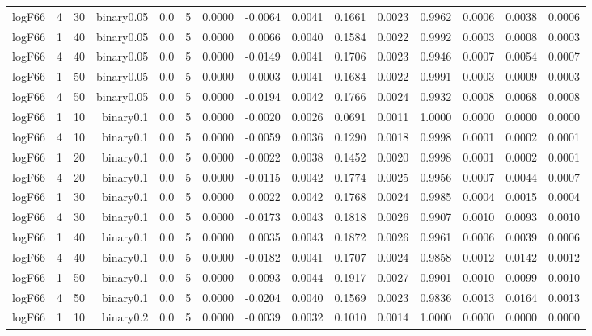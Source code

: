 \begin{longtable}{rrrrrrrrrrrrrrr}
  logF66 & 4 & 30 & binary0.05 & 0.0 & 5 & 0.0000 & -0.0064 & 0.0041 & 0.1661 & 0.0023 & 0.9962 & 0.0006 & 0.0038 & 0.0006 \\ 
  logF66 & 1 & 40 & binary0.05 & 0.0 & 5 & 0.0000 & 0.0066 & 0.0040 & 0.1584 & 0.0022 & 0.9992 & 0.0003 & 0.0008 & 0.0003 \\ 
  logF66 & 4 & 40 & binary0.05 & 0.0 & 5 & 0.0000 & -0.0149 & 0.0041 & 0.1706 & 0.0023 & 0.9946 & 0.0007 & 0.0054 & 0.0007 \\ 
  logF66 & 1 & 50 & binary0.05 & 0.0 & 5 & 0.0000 & 0.0003 & 0.0041 & 0.1684 & 0.0022 & 0.9991 & 0.0003 & 0.0009 & 0.0003 \\ 
  logF66 & 4 & 50 & binary0.05 & 0.0 & 5 & 0.0000 & -0.0194 & 0.0042 & 0.1766 & 0.0024 & 0.9932 & 0.0008 & 0.0068 & 0.0008 \\ 
  logF66 & 1 & 10 & binary0.1 & 0.0 & 5 & 0.0000 & -0.0020 & 0.0026 & 0.0691 & 0.0011 & 1.0000 & 0.0000 & 0.0000 & 0.0000 \\ 
  logF66 & 4 & 10 & binary0.1 & 0.0 & 5 & 0.0000 & -0.0059 & 0.0036 & 0.1290 & 0.0018 & 0.9998 & 0.0001 & 0.0002 & 0.0001 \\ 
  logF66 & 1 & 20 & binary0.1 & 0.0 & 5 & 0.0000 & -0.0022 & 0.0038 & 0.1452 & 0.0020 & 0.9998 & 0.0001 & 0.0002 & 0.0001 \\ 
  logF66 & 4 & 20 & binary0.1 & 0.0 & 5 & 0.0000 & -0.0115 & 0.0042 & 0.1774 & 0.0025 & 0.9956 & 0.0007 & 0.0044 & 0.0007 \\ 
  logF66 & 1 & 30 & binary0.1 & 0.0 & 5 & 0.0000 & 0.0022 & 0.0042 & 0.1768 & 0.0024 & 0.9985 & 0.0004 & 0.0015 & 0.0004 \\ 
  logF66 & 4 & 30 & binary0.1 & 0.0 & 5 & 0.0000 & -0.0173 & 0.0043 & 0.1818 & 0.0026 & 0.9907 & 0.0010 & 0.0093 & 0.0010 \\ 
  logF66 & 1 & 40 & binary0.1 & 0.0 & 5 & 0.0000 & 0.0035 & 0.0043 & 0.1872 & 0.0026 & 0.9961 & 0.0006 & 0.0039 & 0.0006 \\ 
  logF66 & 4 & 40 & binary0.1 & 0.0 & 5 & 0.0000 & -0.0182 & 0.0041 & 0.1707 & 0.0024 & 0.9858 & 0.0012 & 0.0142 & 0.0012 \\ 
  logF66 & 1 & 50 & binary0.1 & 0.0 & 5 & 0.0000 & -0.0093 & 0.0044 & 0.1917 & 0.0027 & 0.9901 & 0.0010 & 0.0099 & 0.0010 \\ 
  logF66 & 4 & 50 & binary0.1 & 0.0 & 5 & 0.0000 & -0.0204 & 0.0040 & 0.1569 & 0.0023 & 0.9836 & 0.0013 & 0.0164 & 0.0013 \\ 
  logF66 & 1 & 10 & binary0.2 & 0.0 & 5 & 0.0000 & -0.0039 & 0.0032 & 0.1010 & 0.0014 & 1.0000 & 0.0000 & 0.0000 & 0.0000 \\ 

\end{longtable}

